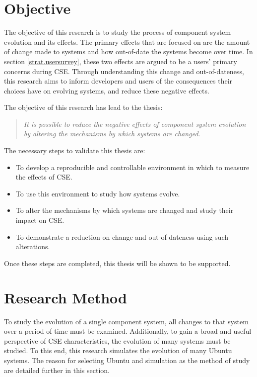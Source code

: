 \section{Objective}
The objective of this research is to study the process of component system evolution and its effects.
The primary effects that are focused on are the amount of change made to systems and how out-of-date the systems become over time.
In section \ref{strat.usersurvey}, these two effects are argued to be a users' primary concerns during CSE.
Through understanding this change and out-of-dateness,
this research aims to inform developers and users of the consequences their choices have on evolving systems,
and reduce these negative effects.

The objective of this research has lead to the thesis:
\begin{quote}
\textit{It is possible to reduce the negative effects of component system evolution by altering the mechanisms by which systems are changed.} 
\end{quote}

The necessary steps to validate this thesis are:
\begin{itemize}
  \item To develop a reproducible and controllable environment in which to measure the effects of CSE.
  \item To use this environment to study how systems evolve.
  \item To alter the mechanisms by which systems are changed and study their impact on CSE.
  \item To demonstrate a reduction on change and out-of-dateness using such alterations.
\end{itemize}

Once these steps are completed, this thesis will be shown to be supported.  

\section{Research Method}
To study the evolution of a single component system, all changes to that system over a period of time must be examined.
Additionally, to gain a broad and useful perspective of CSE characteristics, the evolution of many systems must be studied.
To this end, this research simulates the evolution of many Ubuntu systems.
The reason for selecting Ubuntu and simulation as the method of study are detailed further in this section.

